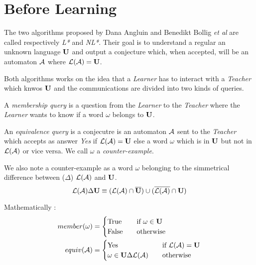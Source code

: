 \section{Before Learning}
The two algorithms proposed by Dana Angluin and Benedikt Bollig \textit{et al} are called respectively \textit{L*} and \textit{NL*}. Their goal is to understand a regular an unknown language $\mathbf{U}$ and output a conjecture which, when accepted, will be an automaton $\mathcal{A}$ where $\mathcal{L}(\mathcal{A}) = \mathbf{U}$.

Both algorithms works on the idea that a \textit{Learner} has to interact with a \textit{Teacher} which knwos $\mathbf{U}$ and the communications are divided into two kinds of queries.

\begin{definition}
  A \textit{membership query} is a question from the \textit{Learner} to the \textit{Teacher} where the \textit{Learner} wants to know if a word $\omega$ belongs to $\mathbf{U}$.
\end{definition}

\begin{definition}
  An \textit{equivalence query} is a conjecutre is an automaton $\mathcal{A}$ sent to the \textit{Teacher} which accepts as answer \textit{Yes} if $\mathcal{L}(\mathcal{A}) = \mathbf{U}$ else a word $\omega$ which is in $\mathbf{U}$ but not in $\mathcal{L}(\mathcal{A})$ or vice versa. We call $\omega$ a \textit{counter-example}.
\end{definition}

We also note a counter-example as a word $\omega$ belonging to the simmetrical difference between ($\Delta$) $\mathcal{L}(\mathcal{A})$ and $\mathbf{U}$.
\[\mathcal{L}(\mathcal{A}) \Delta \mathbf{U} \equiv (\mathcal{L}(\mathcal{A}) \cap \overline{\mathbf{U}}) \cup (\overline{\mathcal{L}(\mathcal{A})} \cap \mathbf{U})\]

Mathematically :
\begin{align*}
  member(\omega) & =
  \begin{cases}
    \text{True}  & \quad \text{if } \omega \in \mathbf{U} \\
    \text{False} & \quad \text{otherwise}
  \end{cases}
  \\
  equiv(\mathcal{A})      & =
  \begin{cases}
    \text{Yes}               & \quad \text{if } \mathcal{L}(\mathcal{A}) = \mathbf{U} \\
    \omega \in \mathbf{U} \Delta \mathcal{L}(\mathcal{A}) & \quad \text{otherwise}
  \end{cases}
\end{align*}
